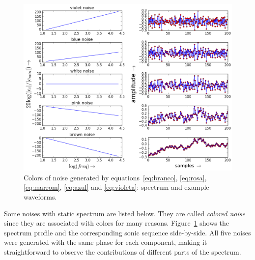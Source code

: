 \begin{figure}
	\hspace*{-.75cm}
         \includegraphics[width=1.\textwidth]{figures/ruidos_}
     \caption{Colors of noise generated by equations~\ref{eq:branco}, \ref{eq:rosa}, \ref{eq:marrom}, \ref{eq:azul} and \ref{eq:violeta}: spectrum and example waveforms.}
         \label{fig:ruidos}
\end{figure}

Some noises with static spectrum are listed below. They are called \emph{colored noise} since they are associated with colors for many reasons.
Figure~\ref{fig:ruidos} shows the spectrum profile and the corresponding sonic sequence side-by-side. All five noises were generated with the same phase for each component, making it straightforward to observe the contributions of different parts of the spectrum.

